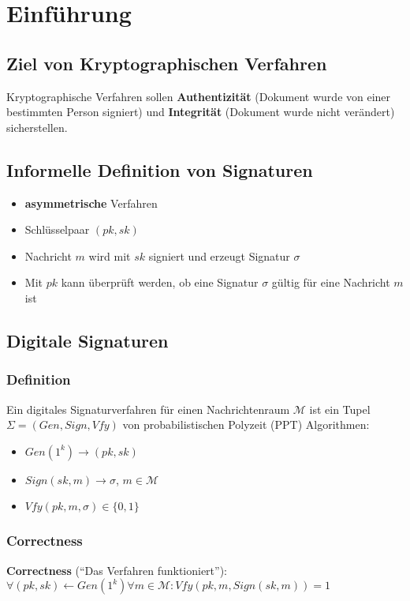 \documentclass[12pt,A4]{extarticle}
\newcommand{\highlight}[1]{\textcolor{highlightColor}{\textbf{#1}}}
\begin{document}
\disclaimer

\tableofcontents
\clearpage

\section{Einführung}
\subsection{Ziel von Kryptographischen Verfahren}
Kryptographische Verfahren sollen \highlight{Authentizität} (Dokument wurde von einer bestimmten Person signiert) und \highlight{Integrität} (Dokument wurde nicht verändert) sicherstellen.

\subsection{Informelle Definition von Signaturen}\label{sec:signaturenDefinition}
\begin{itemize}
  \item{\textbf{asymmetrische} Verfahren}
  \item{Schlüsselpaar $(pk, sk)$}
  \item{Nachricht $m$ wird mit $sk$ signiert und erzeugt Signatur $\sigma$}
  \item{Mit $pk$ kann überprüft werden, ob eine Signatur $\sigma$ gültig für eine Nachricht $m$ ist}
\end{itemize}

\subsection{Digitale Signaturen}
\subsubsection{Definition}
Ein digitales Signaturverfahren für einen Nachrichtenraum $\mathcal{M}$ ist ein Tupel $\Sigma = (Gen, Sign, Vfy)$ von probabilistischen Polyzeit (PPT) Algorithmen:
\begin{itemize}
  \item{$Gen(1^k) \rightarrow (pk, sk)$}
  \item{$Sign(sk, m) \rightarrow \sigma$, $m \in \mathcal{M}$}
  \item{$Vfy(pk, m, \sigma) \in \{0, 1\}$}
\end{itemize}

\subsubsection{Correctness}
\highlight{Correctness} (``Das Verfahren funktioniert''): $\forall (pk, sk) \leftarrow Gen(1^k) \forall m \in \mathcal{M}: Vfy(pk, m, Sign(sk, m)) = 1$
\end{document}
